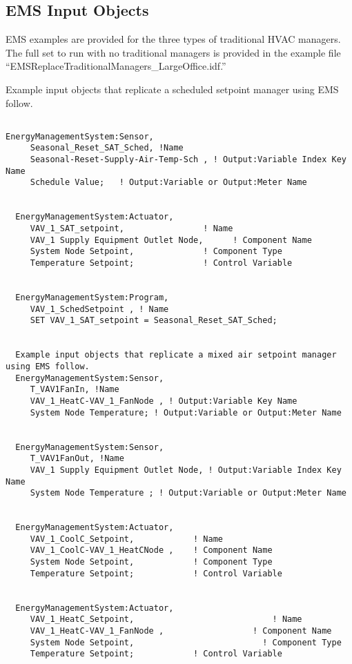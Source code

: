 \subsection{EMS Input Objects}\label{ems-input-objects-004}

EMS examples are provided for the three types of traditional HVAC managers. The full set to run with no traditional managers is provided in the example file ``EMSReplaceTraditionalManagers\_LargeOffice.idf.''

Example input objects that replicate a scheduled setpoint manager using EMS follow.

\begin{lstlisting}

EnergyManagementSystem:Sensor,
     Seasonal_Reset_SAT_Sched, !Name
     Seasonal-Reset-Supply-Air-Temp-Sch , ! Output:Variable Index Key Name
     Schedule Value;   ! Output:Variable or Output:Meter Name


  EnergyManagementSystem:Actuator,
     VAV_1_SAT_setpoint,                ! Name
     VAV_1 Supply Equipment Outlet Node,      ! Component Name
     System Node Setpoint,              ! Component Type
     Temperature Setpoint;              ! Control Variable


  EnergyManagementSystem:Program,
     VAV_1_SchedSetpoint , ! Name
     SET VAV_1_SAT_setpoint = Seasonal_Reset_SAT_Sched;


  Example input objects that replicate a mixed air setpoint manager using EMS follow.
  EnergyManagementSystem:Sensor,
     T_VAV1FanIn, !Name
     VAV_1_HeatC-VAV_1_FanNode , ! Output:Variable Key Name
     System Node Temperature; ! Output:Variable or Output:Meter Name


  EnergyManagementSystem:Sensor,
     T_VAV1FanOut, !Name
     VAV_1 Supply Equipment Outlet Node, ! Output:Variable Index Key Name
     System Node Temperature ; ! Output:Variable or Output:Meter Name


  EnergyManagementSystem:Actuator,
     VAV_1_CoolC_Setpoint,            ! Name
     VAV_1_CoolC-VAV_1_HeatCNode ,    ! Component Name
     System Node Setpoint,            ! Component Type
     Temperature Setpoint;            ! Control Variable


  EnergyManagementSystem:Actuator,
     VAV_1_HeatC_Setpoint,                            ! Name
     VAV_1_HeatC-VAV_1_FanNode ,                  ! Component Name
     System Node Setpoint,                          ! Component Type
     Temperature Setpoint;            ! Control Variable



\end{lstlisting}

